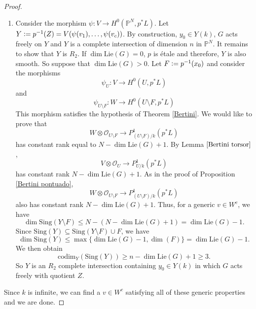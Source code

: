 \documentclass[a4paper,12pt]{amsart}
\numberwithin{equation}{section}
\newcommand{\defeq}{\vcentcolon=}
\renewcommand{\leq}{\leqslant}
\renewcommand{\geq}{\geqslant}
\renewcommand{\_}{\rule{0.25cm}{0.4pt}}
\begin{document}
\begin{proof}
\begin{enumerate}
        \begin{align*}
        \dim(Z\cap (X\setminus X^{\circ})) &\leq \dim(X\setminus X^{\circ})-c=\dim(\mathbb{P}^{N}\setminus U)-c
        \\
        &\leq N-r-c=n-r\leq -1.
        \end{align*}
        Then $Z\subseteq X^{\circ}$. So $Z$ is a smooth complete intersection of dimension $n$ contained in $X^{\circ}$ such that $x_{0}\in Z(k)$.
        \item Consider the morphism $\psi\colon V\to H^{0}(\mathbb{P}^{N},p^{\ast}L)$. Let $Y\defeq p^{-1}(Z)=V(\psi(v_{1}),\dots, \psi(v_{c}))$. By construction, $y_{0}\in Y(k)$, $G$ acts freely on $Y$ and $Y$ is a complete intersection of dimension $n$ in $\mathbb{P}^{N}$. It remains to show that $Y$ is $R_{2}$. If $\dim\text{Lie}(G)=0$, $p$ is étale and therefore, $Y$ is also smooth. So suppose that $\dim\text{Lie}(G)>0$. Let $F\defeq p^{-1}(x_{0})$ and consider the morphisms 
        \[
        \psi_{U}\colon V\to H^{0}(U,p^{\ast}L)
        \]
        and
        \[
        \psi_{U\setminus F}\colon W\to H^{0}(U\setminus F,p^{\ast}L)
        \]
        This morphism satisfies the hypothesis of Theorem \ref{Bertini}. We would like to prove that
        \[
        W\otimes \mathcal{O}_{U\setminus F}\to P^{1}_{(U\setminus F)/k}(p^{\ast}L)
        \] 
        has constant rank equal to $N-\dim\text{Lie}(G)+1$. By Lemma $\ref{Bertini torsor}$,
        \[
        V\otimes \mathcal{O}_{U}\to P^{1}_{U/k}(p^{\ast}L)
        \]
        has constant rank $N-\dim\text{Lie}(G)+1$. As in the proof of Proposition \ref{Bertini pontuado},
        \[
        W\otimes \mathcal{O}_{U\setminus F}\to P^{1}_{(U\setminus F)/k}(p^{\ast}L)
        \] 
        also has constant rank $N-\dim\text{Lie}(G)+1$. Thus, for a generic $v\in W^{c}$, we have
        \[
        \dim\text{Sing}(Y\setminus F)\leq N-(N-\dim\text{Lie}(G)+1)=\dim\text{Lie}(G)-1.
        \]
        Since $\text{Sing}(Y)\subseteq \text{Sing}(Y\setminus F)\cup F$, we have
        \[
        \dim\text{Sing}(Y)\leq \max\{\dim\text{Lie}(G)-1,\dim(F)\}=\dim\text{Lie}(G)-1.
        \]
        We then obtain
        \[
        \text{codim}_{Y}(\text{Sing}(Y))\geq n-\dim\text{Lie}(G)+1\geq 3.
        \]
        So $Y$ is an $R_{2}$ complete intersection containing $y_{0}\in Y(k)$ in which $G$ acts freely with quotient $Z$.
    \end{enumerate}
    Since $k$ is infinite, we can find a $v\in W^{c}$ satisfying all of these generic properties and we are done.
\end{proof}
\end{document}
